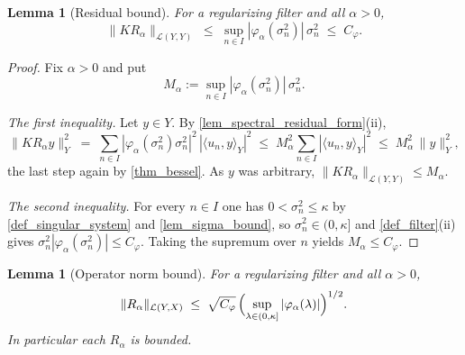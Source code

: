 \documentclass[a4paper]{report}
\theoremstyle{plain}
\newtheorem{lemma}[theorem]{Lemma}
\theoremstyle{definition}
\theoremstyle{remark}
\newcommand{\Ll}{\mathcal{L}}
\begin{document}
\begin{lemma}[Residual bound]
  \label{lem_filter_residual_bound}
  For a regularizing filter and all $\alpha > 0$,
  \[
    \|K R_{\alpha}\|_{\Ll(Y,Y)} \;\le\; \sup_{n \in I}
      |\varphi_{\alpha}(\sigma_n^{2})|\,\sigma_n^{2} \;\le\; C_{\varphi} .
  \]
\end{lemma}

\begin{proof}
  Fix $\alpha > 0$ and put
  \[
    M_{\alpha} := \sup_{n \in I}|\varphi_{\alpha}(\sigma_n^{2})|\,\sigma_n^{2} .
  \]

  \emph{The first inequality.}  Let $y \in Y$.  By \cref{lem_spectral_residual_form}(ii),
  \[
    \|KR_{\alpha}y\|_Y^{2} \;=\; \sum_{n \in I} |\varphi_{\alpha}(\sigma_n^{2})
      \sigma_n^{2}|^{2}\,|\langle u_n,y\rangle_Y|^{2}
      \;\le\; M_{\alpha}^{2} \sum_{n \in I} |\langle u_n,y\rangle_Y|^{2}
      \;\le\; M_{\alpha}^{2}\,\|y\|_Y^{2},
  \]
  the last step again by \cref{thm_bessel}.  As $y$ was arbitrary,
  $\|KR_{\alpha}\|_{\Ll(Y,Y)} \le M_{\alpha}$.

  \emph{The second inequality.}  For every $n \in I$ one has $0 < \sigma_n^{2} \le
  \kappa$ by \cref{def_singular_system} and \cref{lem_sigma_bound}, so
  $\sigma_n^{2} \in (0,\kappa]$ and \cref{def_filter}(ii)
  gives $\sigma_n^{2}|\varphi_{\alpha}(\sigma_n^{2})| \le C_{\varphi}$.  Taking the
  supremum over $n$ yields $M_{\alpha} \le C_{\varphi}$.
\end{proof}


\begin{lemma}[Operator norm bound]
  \label{lem_filter_norm_bound}
  For a regularizing filter and all $\alpha > 0$,
  \[
    \|R_{\alpha}\|_{\Ll(Y,X)} \;\le\; \sqrt{C_{\varphi}}\,
      \Bigl(\sup_{\lambda \in (0,\kappa]} |\varphi_{\alpha}(\lambda)|\Bigr)^{1/2} .
  \]
  In particular each $R_{\alpha}$ is bounded.
\end{lemma}
\end{document}
